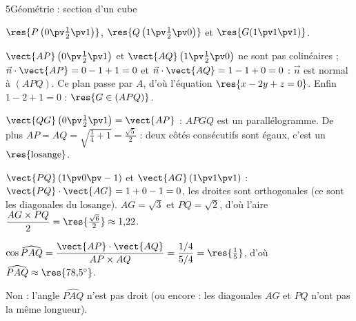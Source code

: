 \begin{corrigeBac}{5}{Géométrie : section d'un cube}
\begin{questions}
  \item $\res{P\left(0\pv\tfrac12\pv1\right)}$, $\res{Q\left(1\pv\tfrac12\pv0\right)}$ et $\res{G(1\pv1\pv1)}$. 
  \item $\vect{AP}\left(0\pv\frac12\pv1\right)$ et $\vect{AQ}\left(1\pv\frac12\pv0\right)$ ne sont pas colinéaires ; $\vec n\cdot\vect{AP}=0-1+1=0$ et
    $\vec n\cdot\vect{AQ}=1-1+0=0$ : $\vec n$ est normal à $(APQ)$. Ce plan passe par $A$, d'où l'équation $\res{x-2y+z=0}$. Enfin
    $1-2+1=0$ : $\res{G\in(APQ)}$. 
  \item $\vect{QG}\left(0\pv\frac12\pv1\right)=\vect{AP}$ : $APGQ$ est un parallélogramme. De plus
    $AP=AQ=\sqrt{\frac14+1}=\frac{\sqrt5}{2}$ : deux côtés consécutifs sont égaux, c'est un $\res{\text{losange}}$. \pts{1 pt}
  \item $\vect{PQ}\,(1\pv0\pv-1)$ et $\vect{AG}\,(1\pv1\pv1)$ : $\vect{PQ}\cdot\vect{AG}=1+0-1=0$, les droites sont orthogonales (ce sont les
    diagonales du losange). $AG=\sqrt3$ et $PQ=\sqrt2$, d'où l'aire $\dfrac{AG\times PQ}{2}=\res{\tfrac{\sqrt6}{2}}\approx1{,}22$. \pts{1 pt}
  \item $\cos\widehat{PAQ}=\dfrac{\vect{AP}\cdot\vect{AQ}}{AP\times AQ}=\dfrac{1/4}{5/4}=\res{\tfrac15}$, d'où
    $\widehat{PAQ}\approx\res{78{,}5^\circ}$. 
  \item Non : l'angle $\widehat{PAQ}$ n'est pas droit (ou encore : les diagonales $AG$ et $PQ$ n'ont pas la même longueur). 
\end{questions}
\end{corrigeBac}

